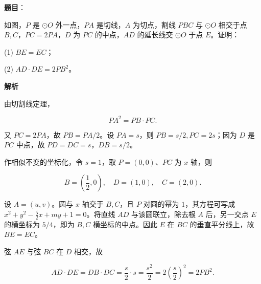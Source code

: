 \begin{answer}

\textbf{题目}：

如图，$P$ 是 $\odot O$ 外一点，$PA$ 是切线，$A$ 为切点，割线 $PBC$ 与 $\odot O$ 相交于点 $B,C$，$PC=2PA$，$D$ 为 $PC$ 的中点，$AD$ 的延长线交 $\odot O$ 于点 $E$。证明：
\nopagebreak[4]
\begin{center}\end{center}
\nopagebreak[4]
(1) $BE=EC$；

(2) $AD\cdot DE=2PB^2$。

\textbf{解析}

由切割线定理，

\nopagebreak[4]
\[
PA^2=PB\cdot PC.
\]

又 $PC=2PA$，故 $PB=PA/2$。设 $PA=s$，则 $PB=s/2,PC=2s$；因为 $D$ 是 $PC$ 中点，故 $PD=DC=s$，$DB=s/2$。


作相似不变的坐标化，令 $s=1$，取 $P=(0,0)$、$PC$ 为 $x$ 轴，则

\nopagebreak[4]
\[
B=\left(\frac12,0\right),\quad D=(1,0),\quad C=(2,0).
\]

设 $A=(u,v)$。圆与 $x$ 轴交于 $B,C$，且 $P$ 对圆的幂为 $1$，其方程可写成 $x^2+y^2-\frac52x+my+1=0$。将直线 $AD$ 与该圆联立，除去根 $A$ 后，另一交点 $E$ 的横坐标为 $5/4$，即为 $B,C$ 横坐标的中点。因此 $E$ 在 $BC$ 的垂直平分线上，故 $BE=EC$。


弦 $AE$ 与弦 $BC$ 在 $D$ 相交，故

\nopagebreak[4]
\[
AD\cdot DE=DB\cdot DC=\frac{s}{2}\cdot s=\frac{s^2}{2}=2\left(\frac{s}{2}\right)^2=2PB^2.
\]



\end{answer}
